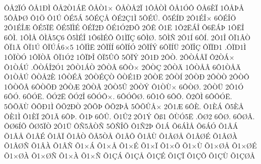 {^^d4^^c52^^cf^^d3
^^d4^^c51^^d0^^cc
^^d4^^c52^^d21^^c1^^cb
^^d4^^c5^^d21^^d7
^^d4^^c5^^d2^^c52^^cf
1^^d4^^c5^^d2^^cc
^^d4^^c51^^d3^^d4
^^d4^^c56^^c8^^cf
1^^d4^^c5^^de^^c5
5^^d4^^c5^^de^^d8
^^d41^^d6
^^d41^^da
^^d4^^c95^^c1
5^^d4^^c9^^c7^^c5
^^d4^^c92^^c71^^cc
5^^d4^^c9^^da.
^^d45^^c9^^cd^^d0
2^^d41^^c9^^ce^^d7
6^^d4^^c9^^ce^^d6
2^^d41^^c9^^ce^^c6
^^d4^^c95^^cf^^cb
^^d4^^c95^^cf^^cc^^c9
^^d4^^c9^^cf2^^d0
^^d4^^c91^^d32^^d0^^d5
2^^d4^^ca
^^d41^^cb
1^^d42^^cb^^c1^^ce
^^d46^^cb^^c1^^de
1^^d4^^cb^^ce
6^^d4^^cc.
1^^d4^^cc^^c5
^^d4^^cc^^c55^^c76
^^d45^^cc^^c9^^ce
1^^d46^^cc^^c9^^d4
^^d41^^cc^^cf^^c7
6^^d4^^cc^^d8.
5^^d4^^cc^^d1
2^^d41^^cd
6^^d4^^cd.
2^^d41^^ce
^^d4^^cf1^^c2^^d2
^^d4^^cf1^^c4
^^d4^^cf1^^da
^^d4^^cf^^da^^c16^^d75
1^^d4^^cf^^cc^^cb
2^^d4^^cf^^cd^^cd
6^^d4^^cf^^cd^^d3
2^^d4^^cf^^cd^^dd
6^^d4^^cf^^cd^^dc
2^^d4^^cf^^ce^^c7
^^d4^^cf^^cf^^d01
.^^d4^^cf^^d01^^cc
1^^d4^^cf^^d2^^d3
1^^d4^^cf^^d2^^c3
^^d4^^cf1^^d32
1^^d4^^cf^^de^^ce
^^d4^^cf5^^db^^d4
5^^d4^^cf^^dd
2^^d41^^d0
2^^d4^^d2.
2^^d4^^d2^^c1^^c2^^cf
^^d42^^d2^^c1^^d7
^^d41^^d2^^c1^^da
.^^d4^^d2^^c1^^ce2^^d31
2^^d4^^d21^^c1^^d2
2^^d4^^d2^^c2
6^^d4^^d2^^d7
2^^d4^^d2^^c7
2^^d4^^d2^^c4
1^^d4^^d2^^c5^^c2
6^^d41^^d2^^c5^^c4
^^d41^^d2^^c5^^da
^^d4^^d2^^c52^^c8
1^^d4^^d2^^c9^^c2
2^^d4^^d2^^c9^^c7^^d2
^^d4^^d2^^c91^^d0
2^^d4^^d2^^cb
2^^d4^^d2^^cd
2^^d4^^d2^^d0
2^^d4^^d2^^d2
2^^d4^^d2^^d4
1^^d4^^d2^^d5^^c2
6^^d4^^d2^^d5^^d0
2^^d4^^d2^^c6
2^^d4^^d2^^c3
2^^d4^^d25^^db
2^^d4^^d2^^dd
^^d41^^d2^^d9^^d7
6^^d4^^d2^^d8.
2^^d4^^d2^^dc
2^^d41^^d3
6^^d4^^d3.
6^^d4^^d3^^cb.
^^d4^^d32^^cb
^^d4^^d32^^ce
6^^d4^^d3^^d4^^d7.
6^^d4^^d3^^d4^^d8.
6^^d41^^d4
6^^d4^^d4.
^^d42^^d4^^cc
6^^d4^^d4^^d3^^cb.
5^^d4^^d5^^c4^^d9
^^d4^^d5^^d01^^cc
^^d4^^d52^^d0^^d2
2^^d4^^d5^^de
^^d4^^d52^^de^^c5
5^^d4^^d5^^db^^c5^^d7
2^^d41^^c6
6^^d4^^c8.
^^d41^^c8^^c1
^^d45^^c8^^c5
^^d4^^c81^^cc
^^d41^^c8^^cf
2^^d41^^c3
6^^d4^^de.
^^d41^^de
6^^d4^^db.
^^d41^^db2
2^^d41^^dd
^^d4^^df1
^^d4^^d9^^d35^^cb
.^^d4^^d82
6^^d4^^d8.
6^^d4^^d8^^c2.
^^d4^^d86^^cd^^d5
^^d4^^d85^^cf^^d2
2^^d41^^dc
^^d4^^d15^^c2^^d2^^d1
5^^d4^^d1^^ce^^d5
^^d41^^d12^^de
^^d51^^c1
^^d56^^c1^^cc^^c5
^^d56^^c1^^d3
^^d51^^c2^^c1
^^d51^^c2^^c5
^^d51^^c2^^c9
^^d51^^c2^^cf
^^d51^^c2^^d2
^^d5^^c25^^d2^^c5
^^d51^^c2^^d5
^^d51^^c2^^d9
^^d51^^c2^^d8^^c5
^^d51^^c2^^d8^^c9
^^d51^^c2^^d8^^c0
^^d51^^c2^^d8^^d1
^^d51^^c2^^c0
^^d51^^c2^^d1
^^d51^^d7^^c1
^^d51^^d7^^c5
^^d51^^d7^^c9
^^d51^^d7^^cf
^^d51^^d7^^d5
^^d51^^d7^^d9
^^d51^^d7^^d8^^c5
^^d51^^d7^^d8^^c9
^^d51^^d7^^d8^^c0
^^d51^^d7^^d8^^d1
^^d51^^d7^^c0
^^d51^^d7^^d1
^^d51^^c7^^c1
^^d51^^c7^^c5
^^d51^^c7^^c9
^^d51^^c7^^cf
^^d51^^c7^^d5
^^d51^^c7^^d9
^^d51^^c7^^d8^^c5
}
